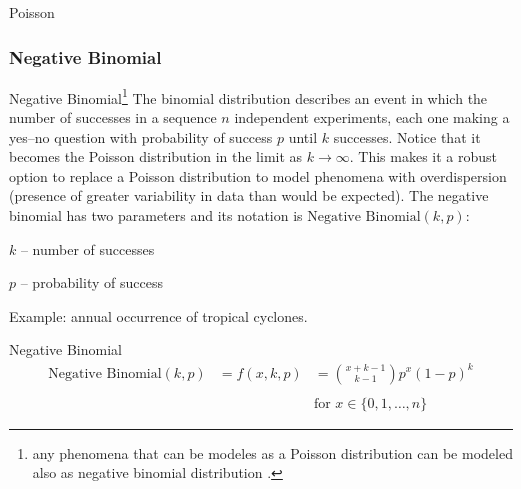 \begin{frame}[noframenumbering]{Poisson}
	\centering
\end{frame}

\subsubsection*{Negative Binomial}
\begin{frame}[noframenumbering]{Negative Binomial\footnote{
			any phenomena that can be modeles as a Poisson distribution can be
			modeled also as negative binomial distribution
			\parencite{gelman2013bayesian, gelman2020regression}.}}
	\small
	The binomial distribution describes an event in which the number of
	successes in a sequence $n$ independent experiments,
	each one making a yes--no question with probability of success $p$
	until $k$ successes.
	Notice that it becomes the Poisson distribution in the limit as $k \to \infty$.
	This makes it a robust option to replace a Poisson distribution to model
	phenomena with overdispersion
	(presence of greater variability in data than would be expected).
	\vfill \small
	The negative binomial has two parameters and its notation is
	$\text{Negative Binomial}(k, p)$:
	\begin{vfilleditems}
		\small
		\item $k$ -- number of successes
		\item $p$ -- probability of success
	\end{vfilleditems}
	\vfil \small
	Example: annual occurrence of tropical cyclones.
\end{frame}

\begin{frame}[noframenumbering]{Negative Binomial}
	$$
		\begin{aligned}
			\text{Negative Binomial}(k, p) & = f(x, k, p) & = \binom{x + k - 1}{k - 1}p^{x}(1-p)^{k} \\
			\\
			                               & ~            & \text{for $x \in \{0, 1, \dots, n\}$}
		\end{aligned}
	$$
\end{frame}

